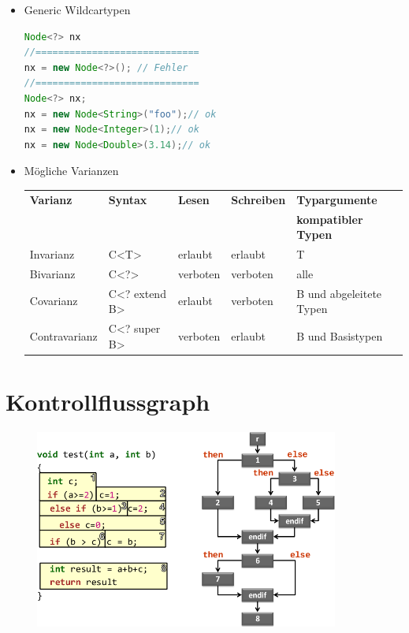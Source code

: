 \begin{itemize}
\begin{lstlisting}[language=JAVA]
\end{lstlisting}
\item Generic Wildcartypen
\begin{lstlisting}[language=Java]
Node<?> nx
//=============================
nx = new Node<?>(); // Fehler
//=============================
Node<?> nx;
nx = new Node<String>("foo");// ok
nx = new Node<Integer>(1);// ok
nx = new Node<Double>(3.14);// ok
\end{lstlisting}
\item Mögliche Varianzen \\
\begin{tabular}{|l|l|l|l|l|}\hline
\textbf{Varianz} & \textbf{Syntax} & \textbf{Lesen}  & \textbf{Schreiben} & \textbf{Typargumente} \\ 
&&&&\textbf{kompatibler Typen} \\\hline
Invarianz & C<T> & erlaubt & erlaubt & T\\\hline
Bivarianz & C<?> & verboten & verboten & alle \\\hline
Covarianz & C<? extend B> & erlaubt & verboten & B und abgeleitete Typen \\\hline
Contravarianz & C<? super B> & verboten & erlaubt & B und Basistypen\\\hline 
\end{tabular}
\end{itemize}
%
%
%
\section{Kontrollflussgraph}
\begin{figure}[H]
\includegraphics[width = 10cm]{mainmatter/pics/Kontrollflussgraph.png}
\end{figure}
%
%
%
